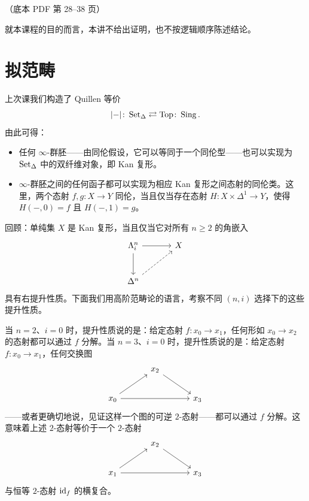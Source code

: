 \begin{center}\small\color{black!55}（底本 PDF 第 28–38 页）\end{center}

就本课程的目的而言，本讲不给出证明，也不按逻辑顺序陈述结论。

\section{拟范畴}

\nitem\label{L4-1.1} 上次课我们构造了 Quillen 等价
\[
|{-}|\colon \operatorname{Set}_\Delta \rightleftarrows \operatorname{Top} \colon \operatorname{Sing}.
\]
由此可得：
\begin{itemize}[leftmargin=2.2em,itemsep=0.1em]
\item 任何 $\infty$-群胚——由同伦假设，它可以等同于一个同伦型——也可以实现为 $\operatorname{Set}_\Delta$ 中的双纤维对象，即 Kan 复形。
\item $\infty$-群胚之间的任何函子都可以实现为相应 Kan 复形之间态射的同伦类。这里，两个态射 $f,g\colon X\to Y$ 同伦，当且仅当存在态射 $H\colon X\times\Delta^1\to Y$，使得 $H(-,0)=f$ 且 $H(-,1)=g$。
\end{itemize}

\nitem\label{L4-1.2} 回顾：单纯集 $X$ 是 Kan 复形，当且仅当它对所有 $n\ge 2$ 的角嵌入
\[
\begin{tikzcd}[column sep=3.4em,row sep=2.6em]
\Lambda^n_i \arrow[r] \arrow[d] & X \\
\Delta^n \arrow[ur, dashed] &
\end{tikzcd}
\]
具有右提升性质。下面我们用高阶范畴论的语言，考察不同 $(n,i)$ 选择下的这些提升性质。

\nitem\label{L4-1.3} 当 $n=2$、$i=0$ 时，提升性质说的是：给定态射 $f\colon x_0\to x_1$，任何形如 $x_0\to x_2$ 的态射都可以通过 $f$ 分解。当 $n=3$、$i=0$ 时，提升性质说的是：给定态射 $f\colon x_0\to x_1$，任何交换图
\[
\begin{tikzcd}[column sep=3.2em,row sep=2.2em]
& x_2 \arrow[dr] & \\
x_0 \arrow[ur] \arrow[rr] & & x_3
\end{tikzcd}
\]
——或者更确切地说，见证这样一个图的可逆 $2$-态射——都可以通过 $f$ 分解。这意味着上述 $2$-态射等价于一个 $2$-态射
\[
\begin{tikzcd}[column sep=3.2em,row sep=2.2em]
& x_2 \arrow[dr] & \\
x_1 \arrow[ur] \arrow[rr] & & x_3
\end{tikzcd}
\]
与恒等 $2$-态射 $\operatorname{id}_f$ 的横复合。

